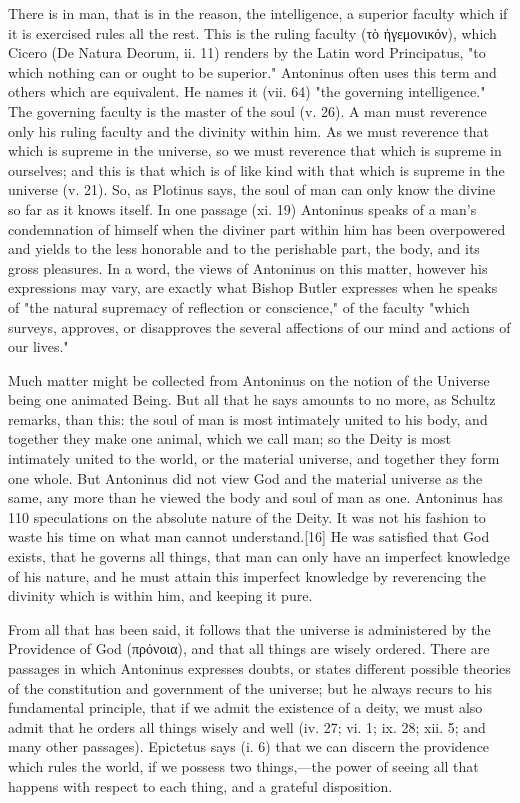 There is in man, that is in the reason, the intelligence, a superior faculty which if it is exercised rules all the rest. This is the ruling faculty (\textgreek{τὸ ἡγεμονικόν}), which Cicero (De Natura Deorum, ii. 11) renders by the Latin word Principatus, "to which nothing can or ought to be superior." Antoninus often uses this term and others which are equivalent. He names it (vii. 64) "the governing intelligence." The governing faculty is the master of the soul (v. 26). A man must reverence only his ruling faculty and the divinity within him. As we must reverence that which is supreme in the universe, so we must reverence that which is supreme in ourselves; and this is that which is of like kind with that which is supreme in the universe (v. 21). So, as Plotinus says, the soul of man can only know the divine so far as it knows itself. In one passage (xi. 19) Antoninus speaks of a man's condemnation of himself when the diviner part within him has been overpowered and yields to the less honorable and to the perishable part, the body, and its gross pleasures. In a word, the views of Antoninus on this matter, however his expressions may vary, are exactly what Bishop Butler expresses when he speaks of "the natural supremacy of reflection or conscience," of the faculty "which surveys, approves, or disapproves the several affections of our mind and actions of our lives."

Much matter might be collected from Antoninus on the notion of the Universe being one animated Being. But all that he says amounts to no more, as Schultz remarks, than this: the soul of man is most intimately united to his body, and together they make one animal, which we call man; so the Deity is most intimately united to the world, or the material universe, and together they form one whole. But Antoninus did not view God and the material universe as the same, any more than he viewed the body and soul of man as one. Antoninus has 110 speculations on the absolute nature of the Deity. It was not his fashion to waste his time on what man cannot understand.[16] He was satisfied that God exists, that he governs all things, that man can only have an imperfect knowledge of his nature, and he must attain this imperfect knowledge by reverencing the divinity which is within him, and keeping it pure.

From all that has been said, it follows that the universe is administered by the Providence of God (\textgreek{πρόνοια}), and that all things are wisely ordered. There are passages in which Antoninus expresses doubts, or states different possible theories of the constitution and government of the universe; but he always recurs to his fundamental principle, that if we admit the existence of a deity, we must also admit that he orders all things wisely and well (iv. 27; vi. 1; ix. 28; xii. 5; and many other passages). Epictetus says (i. 6) that we can discern the providence which rules the world, if we possess two things,—the power of seeing all that happens with respect to each thing, and a grateful disposition.

